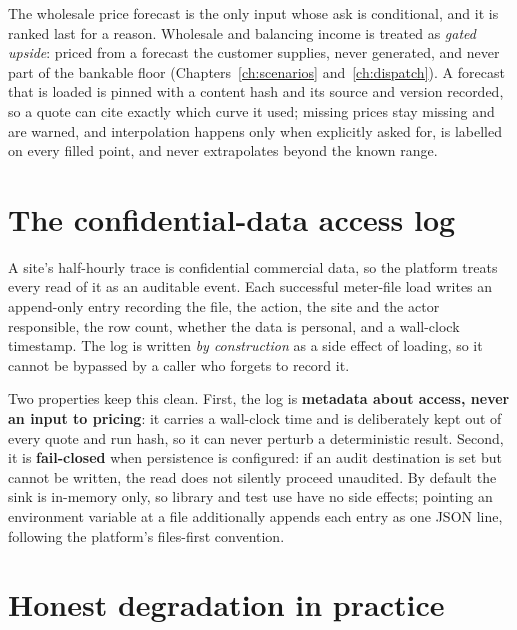\begin{caution}
The wholesale price forecast is the only input whose ask is conditional, and it is ranked last for a reason. Wholesale and balancing income is treated as \emph{gated upside}: priced from a forecast the customer supplies, never generated, and never part of the bankable floor (Chapters~\ref{ch:scenarios} and~\ref{ch:dispatch}). A forecast that is loaded is pinned with a content hash and its source and version recorded, so a quote can cite exactly which curve it used; missing prices stay missing and are warned, and interpolation happens only when explicitly asked for, is labelled on every filled point, and never extrapolates beyond the known range.
\end{caution}

\section{The confidential-data access log}

A site's half-hourly trace is confidential commercial data, so the platform treats every read of it as an auditable event. Each successful meter-file load writes an append-only entry recording the file, the action, the site and the actor responsible, the row count, whether the data is personal, and a wall-clock timestamp. The log is written \emph{by construction} as a side effect of loading, so it cannot be bypassed by a caller who forgets to record it.

Two properties keep this clean. First, the log is \textbf{metadata about access, never an input to pricing}: it carries a wall-clock time and is deliberately kept out of every quote and run hash, so it can never perturb a deterministic result. Second, it is \textbf{fail-closed} when persistence is configured: if an audit destination is set but cannot be written, the read does not silently proceed unaudited. By default the sink is in-memory only, so library and test use have no side effects; pointing an environment variable at a file additionally appends each entry as one JSON line, following the platform's files-first convention.

\section{Honest degradation in practice}

